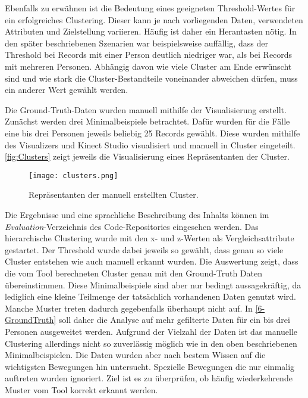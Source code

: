 Ebenfalls zu erwähnen ist die Bedeutung eines geeigneten Threshold-Wertes für ein erfolgreiches Clustering.
Dieser kann je nach vorliegenden Daten, verwendeten Attributen und Zielstellung variieren.
Häufig ist daher ein {\glqq Herantasten\grqq} nötig.
In den später beschriebenen Szenarien war beispielsweise auffällig,
dass der Threshold bei Records mit einer Person deutlich niedriger war,
als bei Records mit mehreren Personen.
Abhängig davon wie viele Cluster am Ende erwünscht sind
und wie stark die Cluster-Bestandteile voneinander abweichen dürfen,
muss ein anderer Wert gewählt werden.

Die Ground-Truth-Daten wurden manuell mithilfe der Visualisierung erstellt.
Zunächst werden drei Minimalbeispiele betrachtet.
Dafür wurden für die Fälle eine bis drei Personen jeweils beliebig 25 Records gewählt.
Diese wurden mithilfe des Visualizers und Kinect Studio visualisiert und manuell in Cluster eingeteilt.
\autoref{fig:Clusters} zeigt jeweils die Visualisierung eines Repräsentanten der Cluster.
\begin{figure}[ht]
    \begin{center}
    \texttt{[image: clusters.png]}
    \end{center}
    \caption{Repräsentanten der manuell erstellten Cluster.}
    \label{fig:Clusters}
\end{figure}
Die Ergebnisse und eine sprachliche Beschreibung des Inhalts
können im \emph{Evaluation}-Verzeichnis des Code-Repositories eingesehen werden.
Das hierarchische Clustering wurde mit den x- und z-Werten als Vergleichsattribute gestartet.
Der Threshold wurde dabei jeweils so gewählt,
dass genau so viele Cluster entstehen wie auch manuell erkannt wurden.
Die Auswertung zeigt, dass die vom Tool berechneten Cluster genau mit den Ground-Truth Daten übereinstimmen.
Diese Minimalbeispiele sind aber nur bedingt aussagekräftig,
da lediglich eine kleine Teilmenge der tatsächlich vorhandenen Daten genutzt wird.
Manche Muster treten dadurch gegebenfalls überhaupt nicht auf.
In \autoref{6-GroundTruth} soll daher die Analyse auf mehr gefilterte Daten
für ein bis drei Personen ausgeweitet werden.
Aufgrund der Vielzahl der Daten ist das manuelle Clustering allerdings nicht so
zuverlässig möglich wie in den oben beschriebenen Minimalbeispielen.
Die Daten wurden aber nach bestem Wissen auf die wichtigsten Bewegungen hin untersucht.
Spezielle Bewegungen die nur einmalig auftreten wurden ignoriert.
Ziel ist es zu überprüfen,
ob häufig wiederkehrende Muster vom Tool korrekt erkannt werden.

